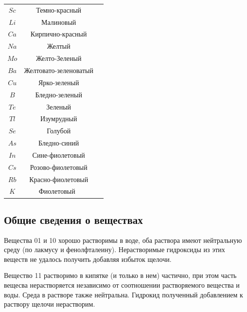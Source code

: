 \documentclass[a4paper,14pt,titlepage,twoside]{article}
\begin{document}
\begin{enumerate}
                    \begin{center}
                        \begin{tabular}{ccc}
                            $Sc$ & Темно-красный \\
                            $Li$ & Малиновый\\
                            $Ca$ & Кирпично-красный\\
                            $Na$ & Желтый\\
                            $Mo$ & Желто-Зеленый\\
                            $Ba$ & Желтовато-зеленоватый\\
                            $Cu$ & Ярко-зеленый\\
                            $B$ & Бледно-зеленый\\
                            $Te$ & Зеленый\\
                            $Tl$ & Изумрудный\\
                            $Se$ & Голубой\\
                            $As$ & Бледно-синий\\
                            $In$ & Сине-фиолетовый\\
                            $Cs$ & Розово-фиолетовый\\
                            $Rb$ & Красно-фиолетовый\\
                            $K$ & Фиолетовый\
                        \end{tabular}
                    \end{center}


            \end{enumerate}
        \subsection{Общие сведения о веществах}
            Вещества 01 и 10 хорошо растворимы в воде, оба раствора имеют нейтральную среду
            (по лакмусу и фенолфталеину). Нерастворимые гидроксиды из этих веществ не удалось получить
            добавляя избыток щелочи.

            Вещество 11 растворимо в кипятке (и только в нем) частично, при этом часть
            вещесва нерастворяется независимо от соотношении растворяемого вещества и воды.
            Среда в растворе также нейтральна. Гидрокид полученный добавлением к раствору щелочи нерастворим.
\end{document}
